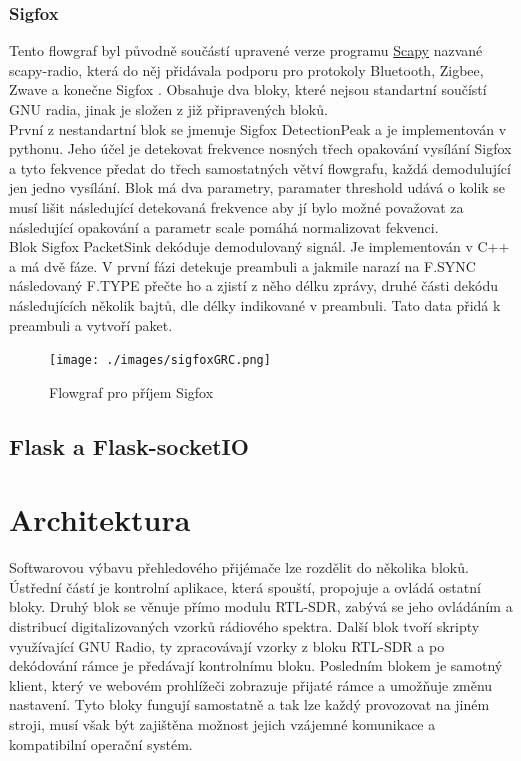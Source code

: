\documentclass{ctuthesis}
\begin{document}
\subsubsection{Sigfox}
Tento flowgraf byl původně součástí upravené verze programu \href{https://scapy.net}{Scapy} nazvané scapy-radio, která do něj přidávala podporu pro protokoly Bluetooth, Zigbee, Zwave a konečne Sigfox \cite{cybertools2016}. Obsahuje dva bloky, které nejsou standartní součístí GNU radia, jinak je složen z již připravených bloků.\\
První z nestandartní blok se jmenuje Sigfox DetectionPeak a je implementován v pythonu. Jeho účel je detekovat frekvence nosných třech opakování vysílání Sigfox a tyto fekvence předat do třech samostatných větví flowgrafu, každá demodulující jen jedno vysílání. Blok má dva parametry, paramater threshold udává o kolik se musí lišit následující detekovaná frekvence aby jí bylo možné považovat za následující opakování a parametr scale pomáhá normalizovat fekvenci.\\
Blok Sigfox PacketSink dekóduje demodulovaný signál. Je implementován v C++ a má dvě fáze. V první fázi detekuje preambuli a jakmile narazí na F.SYNC následovaný F.TYPE přečte ho a zjistí z něho délku zprávy, druhé části dekódu následujících několik bajtů, dle délky indikované v preambuli. Tato data přidá k preambuli a vytvoří paket.
\begin{figure}
\caption{Flowgraf pro příjem Sigfox}
\texttt{[image: ./images/sigfoxGRC.png]}
\label{sigfoxGRC}
\end{figure}

\subsection{Flask a Flask-socketIO}


\section{Architektura}
Softwarovou výbavu přehledového přijémače lze rozdělit do několika bloků. Ústřední částí je kontrolní aplikace, která spouští, propojuje a ovládá ostatní bloky. Druhý blok se věnuje přímo modulu RTL-SDR, zabývá se jeho ovládáním a distribucí digitalizovaných vzorků rádiového spektra. Další blok tvoří skripty využívající GNU Radio, ty zpracovávají vzorky z bloku RTL-SDR a po dekódování rámce je předávají kontrolnímu bloku. Posledním blokem je samotný klient, který ve webovém prohlížeči zobrazuje přijaté rámce a umožňuje změnu nastavení. Tyto bloky fungují samostatně a tak lze každý provozovat na jiném stroji, musí však být zajištěna možnost jejich vzájemné komunikace a kompatibilní operační systém.
\end{document}
